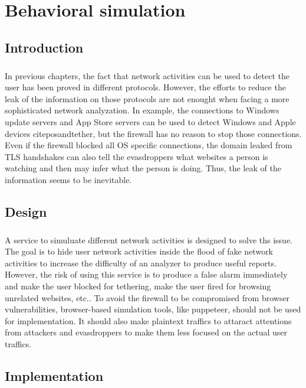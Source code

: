 \documentclass[mscthesis]{usiinfthesis}
\begin{document}
\chapter{Behavioral simulation}
\section{Introduction}
\paragraph{}
In previous chapters, the fact that network activities can be used to detect the user has been proved in different protocols. However, the efforts to reduce the leak of the information on those protocols are not enought when facing a more sophisticated network analyzation. In example, the connections to Windows update servers and App Store servers can be used to detect Windows and Apple devices citep{osandtether}, but the firewall has no reason to stop those connections. Even if the firewall blocked all OS specific connections, the domain leaked from TLS handshakes can also tell the evasdroppers what websites a person is watching and then may infer what the person is doing. Thus, the leak of the information seems to be inevitable.

\section{Design}
\paragraph{}
A service to simuluate different network activities is designed to solve ths issue. The goal is to hide user network activities inside the flood of fake network activities to increase the difficulty of an analyzer to produce useful reports. However, the risk of using this service is to produce a false alarm immediately and make the user blocked for tethering, make the user fired for browsing unrelated websites, etc.. To avoid the firewall to be compromised from browser vulnerabilities, browser-based simulation tools, like puppeteer, should not be used for implementation. It should also make plaintext traffics to attaract attentions from attackers and evasdroppers to make them less focused on the actual user traffics.

\section{Implementation}
\end{document}
